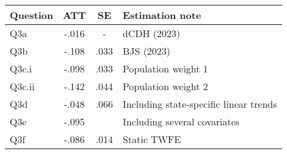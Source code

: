 \begin{center}
\begin{tabular}{lccl}
\hline\hline
Question & ATT & SE & Estimation note \\ [0.5ex]
\hline
Q3a              & -.016  & -                       & dCDH (2023) \\ 
Q3b              & -.108  & .033  & BJS (2023) \\ 
Q3c.i    & -.098 & .033 & Population weight 1 \\ 
Q3c.ii   & -.142 & .044 & Population weight 2 \\ 
Q3d              & -.048  & .066  & Including state-specific linear trends \\ 
Q3e              & -.095  &   & Including several covariates \\ 
Q3f              & -.086  & .014  & Static TWFE \\ 
\hline\hline
\end{tabular}
\end{center}
